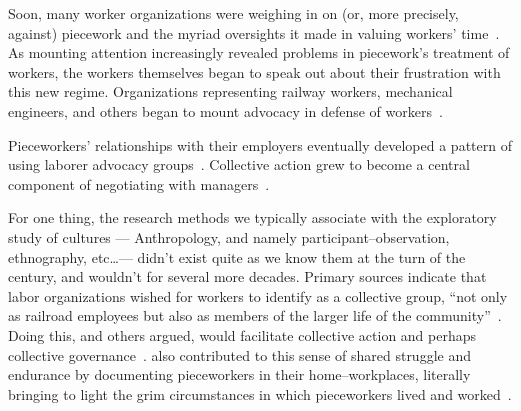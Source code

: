 \documentclass[trackingWork]{subfiles}
\begin{document}
Soon, many worker organizations were weighing in on (or, more precisely, against) piecework and the myriad oversights it made in valuing workers' time~\cite{american1921problem,richards1904anything}.
As mounting attention increasingly revealed problems in piecework's treatment of workers, the workers themselves began to speak out about their frustration with this new regime.
Organizations representing railway workers, mechanical engineers, and others began to mount advocacy in defense of workers~\cite{american1921problem,richards1904anything}.

Pieceworkers' relationships with their employers eventually developed a pattern of using 
laborer advocacy groups~\cite{levi2009union,ahlquist2013interest,
      mccallum2013global,jacoby1983union}.
Collective action grew to become a central component of negotiating with managers~\cite{russell1982collective,olsonlogic}.

For one thing, the research methods we typically associate with the exploratory study of cultures
--- Anthropology, and namely participant--observation, ethnography, etc\dots ---
didn't exist quite as we know them at the turn of the  century, and wouldn't for several more decades.
Primary sources indicate that labor organizations wished for workers to identify as a collective group, 
``not only as railroad employees but also as members of the larger life of the community''~\cite{american1921problem}.
Doing this, 
\citeauthor{ostrom1990governing} and others argued,
would facilitate collective action and perhaps collective governance~\cite{ostrom1990governing,russell1982collective,olsonlogic}.
\citeauthor{riisOtherSideLives} also contributed to this sense of shared struggle and endurance
by documenting pieceworkers in their home--workplaces,
literally bringing to light the grim circumstances in which pieceworkers lived and worked~\cite{riisOtherSideLives}.


\subsubsection{\whatchanged}

\begin{comment}
	*workers make little money but love autonomy --- workers make little money
	workers blamed for quality --- ???
	both cases, sociality is hard
	*collective action hard --- collective action succeeded

	- algorithms, not managers
\end{comment}
\end{document}
